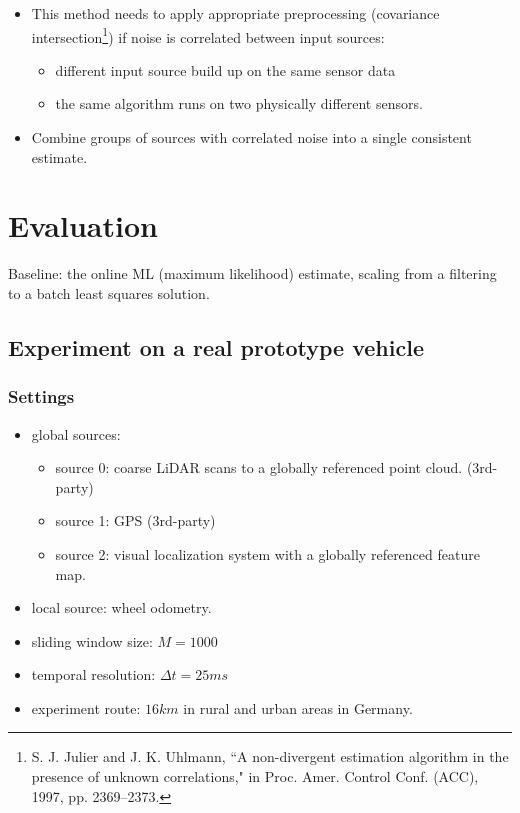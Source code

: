 \documentclass[letterpaper,10pt]{article}
\begin{document}
\begin{itemize}
	\item This method needs to apply appropriate preprocessing (covariance intersection\footnote{S. J. Julier and J. K. Uhlmann, ``A non-divergent estimation algorithm in the presence of unknown correlations," in Proc. Amer. Control Conf. (ACC), 1997, pp. 2369–2373.}) if noise is correlated between input sources:
	\begin{itemize}
		\item different input source build up on the same sensor data
		\item the same algorithm runs on two physically different sensors.
	\end{itemize}
	\item Combine groups of sources with correlated noise into a single consistent estimate.
\end{itemize}

\section{Evaluation}

Baseline: the online ML (maximum likelihood) estimate, scaling from a filtering to a batch least squares solution.

\subsection{Experiment on a real prototype vehicle}

\subsubsection{Settings}
\begin{itemize}
	\item global sources:
	\begin{itemize}
		\item source 0: coarse LiDAR scans to a globally referenced point cloud. (3rd-party)
		\item source 1: GPS (3rd-party)
		\item source 2: visual localization system with a globally referenced feature map.
	\end{itemize}
	\item local source: wheel odometry.
	\item sliding window size: $M=1000$
	\item temporal resolution: $\Delta t=25ms$
	\item experiment route: $16km$ in rural and urban areas in Germany.
\end{itemize}
\end{document}
